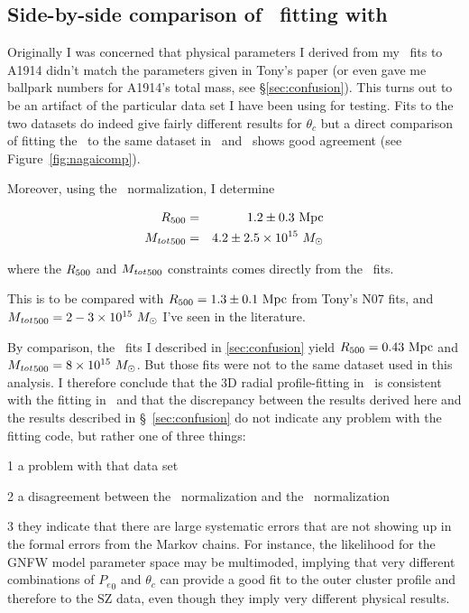 \newpage
\subsection{Side-by-side comparison of \nagaimodel\ fitting with \markov}

Originally I was concerned that physical parameters I derived from my
\arnaudmodel\ fits to A1914 didn't match the parameters given in
Tony's paper (or even gave me ballpark numbers for A1914's total mass,
see \S\ref{sec:confusion}).  This turns out to be an artifact of the
particular data set I have been using for testing.  Fits to the two
datasets do indeed give fairly different results for $\theta_c$ but a
direct comparison of fitting the \nagaimodel\ to the same dataset in
\climax\ and \markov\ shows good agreement (see
Figure~\ref{fig:nagaicomp}).  

Moreover, using the \nagaimodel\ normalization, I determine

\begin{eqnarray}\nonumber
\R500  &=& 1.2\pm0.3~{\rm Mpc}\\\nonumber
\Mt500 &=& 4.2\pm2.5\times 10^{15}~\Msolar
\end{eqnarray}

where the $\R500$ and $\Mt500$ constraints comes directly from the
\nagaimodel\ fits.

This is to be compared with $\R500 = 1.3\pm0.1~{\rm Mpc}$ from
Tony's N07 fits, and $\Mt500 = 2-3\times 10^{15}~\Msolar$ I've seen in
the literature.  

By comparison, the \arnaudmodel\ fits I described in
\ref{sec:confusion} yield $\R500 = 0.43~{\rm Mpc}$ and $\Mt500 =
8\times 10^{15}~\Msolar$.  But those fits were not to the same dataset
used in this analysis.  I therefore conclude that the 3D radial
profile-fitting in \climax\ is consistent with the fitting in
\markov\ and that the discrepancy between the results derived here and
the results described in \S~\ref{sec:confusion} do not indicate any
problem with the fitting code, but rather one of three things:

\begin{list}{}{ \leftmargin {} \addtolength{\leftmargin}{\labelsep}}

\item[1] {a problem with that data set}

\item[2] {a disagreement between the \nagaimodel\ normalization and the
  \arnaudmodel\ normalization}

\item[3] {they indicate that there are large systematic errors that
  are not showing up in the formal errors from the Markov chains. For
  instance, the likelihood for the GNFW model parameter space may be
  multimoded, implying that very different combinations of ${P_e}_0$
  and $\theta_c$ can provide a good fit to the outer cluster profile
  and therefore to the SZ data, even though they imply very different
  physical results.}
\end{list}


